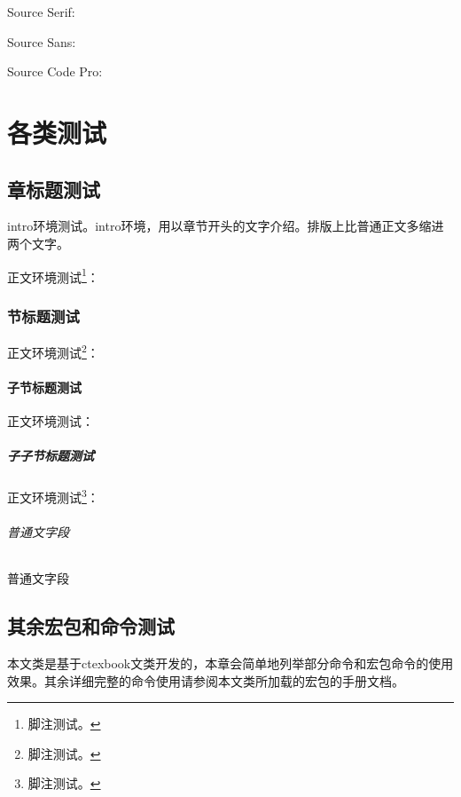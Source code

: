 {Source Serif: \sampletexten}

{\sffamily Source Sans: \sampletexten}

{\ttfamily Source Code Pro: \sampletexten}

\part{各类测试}
\chapter{章标题测试}

\begin{intro}
    intro环境测试。intro环境，用以章节开头的文字介绍。排版上比普通正文多缩进两个文字。\cite{citebook}
\end{intro}

正文环境测试\footnote{脚注测试。\sampletext}： \cite{citeonline,citemanual}

\section{节标题测试}
正文环境测试\footnote{脚注测试。\sampletext}：


\subsection{子节标题测试}
正文环境测试：

\subsubsection{子子节标题测试}
正文环境测试\footnote{脚注测试。\sampletext}：

\paragraph{普通文字段} 

\subparagraph{普通文字段} 

\chapter{其余宏包和命令测试}
\begin{intro}
    本文类是基于ctexbook文类开发的，本章会简单地列举部分命令和宏包命令的使用效果。其余详细完整的命令使用请参阅本文类所加载的宏包的手册文档。
\end{intro}

